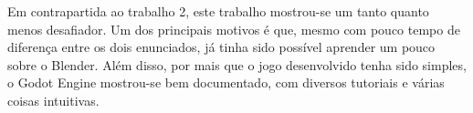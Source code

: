 Em contrapartida ao trabalho 2, este trabalho mostrou-se um tanto quanto menos desafiador. Um dos principais motivos é que, mesmo com pouco tempo de diferença entre os dois enunciados, já tinha sido possível aprender um pouco sobre o Blender. Além disso, por mais que o jogo desenvolvido tenha sido simples, o Godot Engine mostrou-se bem documentado, com diversos tutoriais e várias coisas intuitivas. 


